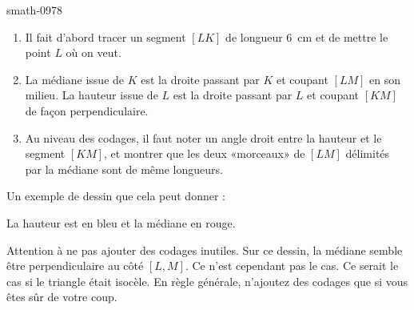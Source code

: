 
\begin{corrige}{smath-0978}

    \begin{enumerate}
        \item
    Il fait d'abord tracer un segment \( [LK]\) de longueur \SI{6}{\centi\meter} et de mettre le point \( L\) où on veut.
\item
    La médiane issue de \( K\) est la droite passant par \( K\) et coupant \( [LM]\) en son milieu. La hauteur issue de \( L\) est la droite passant par \( L\) et coupant \( [KM]\) de façon perpendiculaire.
\item
    Au niveau des codages, il faut noter un angle droit entre la hauteur et le segment \( [KM]\), et montrer que les deux «morceaux» de \( [LM]\) délimités par la médiane sont de même longueurs.
    \end{enumerate}
    
    Un exemple de dessin que cela peut donner :

\begin{center}
   
\end{center}

    La hauteur est en bleu et la médiane en rouge.


    Attention à ne pas ajouter des codages inutiles. Sur ce dessin, la médiane semble être perpendiculaire au côté \( [L,M]\). Ce n'est cependant pas le cas. Ce serait le cas si le triangle était isocèle. En règle générale, n'ajoutez des codages que si vous êtes sûr de votre coup.

\end{corrige}
